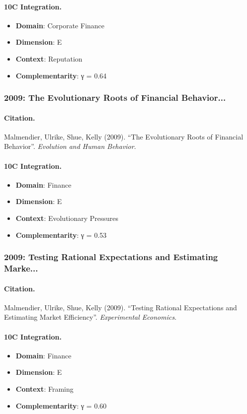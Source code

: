 \paragraph{10C Integration.}
\begin{itemize}[nosep]
  \item \textbf{Domain}: Corporate Finance
  \item \textbf{Dimension}: E
  \item \textbf{Context}: Reputation
  \item \textbf{Complementarity}: γ = 0.64
\end{itemize}


\subsubsection{2009: The Evolutionary Roots of Financial Behavior...}

\paragraph{Citation.}
Malmendier, Ulrike, Shue, Kelly (2009). ``The Evolutionary Roots of Financial Behavior''. \textit{Evolution and Human Behavior}.

\paragraph{10C Integration.}
\begin{itemize}[nosep]
  \item \textbf{Domain}: Finance
  \item \textbf{Dimension}: E
  \item \textbf{Context}: Evolutionary Pressures
  \item \textbf{Complementarity}: γ = 0.53
\end{itemize}


\subsubsection{2009: Testing Rational Expectations and Estimating Marke...}

\paragraph{Citation.}
Malmendier, Ulrike, Shue, Kelly (2009). ``Testing Rational Expectations and Estimating Market Efficiency''. \textit{Experimental Economics}.

\paragraph{10C Integration.}
\begin{itemize}[nosep]
  \item \textbf{Domain}: Finance
  \item \textbf{Dimension}: E
  \item \textbf{Context}: Framing
  \item \textbf{Complementarity}: γ = 0.60
\end{itemize}



